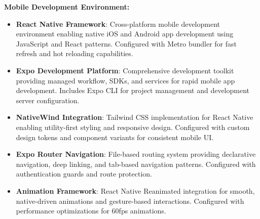 \documentclass[12pt,a4paper]{article}
\begin{document}
\textbf{Mobile Development Environment:}
\begin{itemize}
  \item \textbf{React Native Framework}: Cross-platform mobile development environment enabling native iOS and Android app development using JavaScript and React patterns. Configured with Metro bundler for fast refresh and hot reloading capabilities.
  \item \textbf{Expo Development Platform}: Comprehensive development toolkit providing managed workflow, SDKs, and services for rapid mobile app development. Includes Expo CLI for project management and development server configuration.
  \item \textbf{NativeWind Integration}: Tailwind CSS implementation for React Native enabling utility-first styling and responsive design. Configured with custom design tokens and component variants for consistent mobile UI.
  \item \textbf{Expo Router Navigation}: File-based routing system providing declarative navigation, deep linking, and tab-based navigation patterns. Configured with authentication guards and route protection.
  \item \textbf{Animation Framework}: React Native Reanimated integration for smooth, native-driven animations and gesture-based interactions. Configured with performance optimizations for 60fps animations.
\end{itemize}
\end{document}
